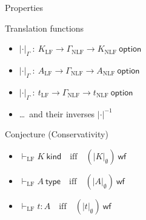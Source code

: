\documentclass[ignorenonframetext,red]{beamer}
\newcommand\app[1]{{#1}\ }
\newcommand\emerge[2]{{#1}\cdot{#2}}
\newcommand\elookupdef[3]{{#1}({#2}) = {#3}}
\newcommand\edefs[1]{\mathsf{defs}({#1})}
\newcommand\conv{\equiv}
\newcommand\jlang[3]{{#2}\vdash_{\mathrm{#1}}{#3}}
\newcommand\jlangt[4]{{#2}\vdash_{\mathrm{#1}}{#3}:{#4}}
\newcommand\jlangA[3]{{#2}\vdash_{\mathrm{#1}}{#3}\mathsf{\ type}}
\newcommand\jlangK[3]{{#2}\vdash_{\mathrm{#1}}{#3}\mathsf{\ kind}}
\newcommand\jlft[3]{\jlangt{LF}{#1}{#2}{#3}}
\newcommand\jlfA[2]{\jlangA{LF}{#1}{#2}}
\newcommand\jlfK[2]{\jlangK{LF}{#1}{#2}}
\newcommand\jnlft[3]{\jlangt{}{#1}{#2}{#3}}
\newcommand\jnlfA[2]{\jlangA{}{#1}{#2}}
\newcommand\jnlfconvA[3]{\jnlfA{#1}{{#2}\conv{#3}}}
\newcommand\jnlfconvt[4]{\jnlft{#1}{{#2}\conv{#3}}{#4}}
\newcommand\jnlfconve[3]{\jlang{}{#1}{{#2}\conv{#3}}}
\newcommand\jwf[1]{{#1}\ \mathsf{wf}}
\begin{document}


\begin{frame}{Properties}
  \begin{block}{Translation functions}
    \begin{itemize}
    \item $|\cdot|_\Gamma\ :\ K_{\mathrm{LF}} \to
      \Gamma_{\mathrm{NLF}} \to K_{\mathrm{NLF}}\ \mathsf{option}$
    \item $|\cdot|_\Gamma\ :\ A_{\mathrm{LF}} \to
      \Gamma_{\mathrm{NLF}} \to A_{\mathrm{NLF}}\ \mathsf{option}$
    \item $|\cdot|_\Gamma\ :\ t_{\mathrm{LF}} \to
      \Gamma_{\mathrm{NLF}} \to t_{\mathrm{NLF}}\ \mathsf{option}$
    \item \ldots\ and their inverses $|\cdot|^{-1}$
    \end{itemize}
  \end{block}
  \begin{block}{Conjecture (Conservativity)}
    \begin{itemize}
    \item $\jlfK {} K \quad\text{iff}\quad \jwf{(|K|_\emptyset)}$
    \item $\jlfA {} A \quad\text{iff}\quad \jwf{(|A|_\emptyset)}$
    \item $\jlft {} t A \quad\text{iff}\quad \jwf{(|t|_\emptyset)} $
    \end{itemize}    
  \end{block}
\end{frame}
\end{document}
